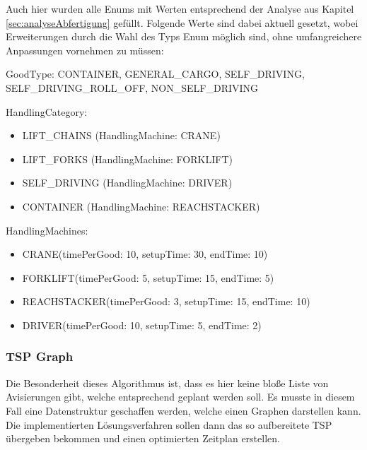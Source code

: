 Auch hier wurden alle Enums mit Werten entsprechend der Analyse aus Kapitel \ref{sec:analyseAbfertigung} gefüllt. Folgende Werte sind dabei aktuell gesetzt, wobei Erweiterungen durch die Wahl des Typs Enum möglich sind, ohne umfangreichere Anpassungen vornehmen zu müssen: 

GoodType: CONTAINER, GENERAL\_CARGO, SELF\_DRIVING, SELF\_DRIVING\_ROLL\_OFF, NON\_SELF\_DRIVING

HandlingCategory:
\begin{itemize}
    \item LIFT\_CHAINS (HandlingMachine: CRANE)
    \item LIFT\_FORKS (HandlingMachine: FORKLIFT)
    \item SELF\_DRIVING (HandlingMachine: DRIVER)
    \item CONTAINER (HandlingMachine: REACHSTACKER)
\end{itemize}

HandlingMachines:
\begin{itemize}
    \item CRANE(timePerGood: 10, setupTime: 30, endTime: 10)
    \item FORKLIFT(timePerGood: 5, setupTime: 15, endTime: 5)
    \item REACHSTACKER(timePerGood: 3, setupTime: 15, endTime: 10)
    \item DRIVER(timePerGood: 10, setupTime: 5, endTime: 2)
\end{itemize}



\subsubsection{TSP Graph}

Die Besonderheit dieses Algorithmus ist, dass es hier keine bloße Liste von Avisierungen gibt, welche entsprechend geplant werden soll. Es musste in diesem Fall eine Datenstruktur geschaffen werden, welche einen Graphen darstellen kann. Die implementierten Lösungsverfahren sollen dann das so aufbereitete TSP übergeben bekommen und einen optimierten Zeitplan erstellen.


